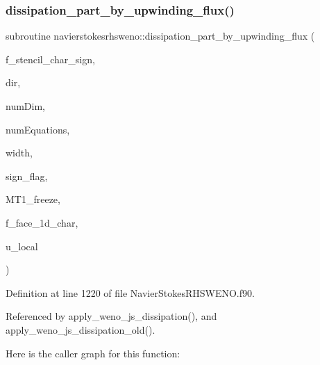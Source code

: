 \subsubsection{\texorpdfstring{dissipation\+\_\+part\+\_\+by\+\_\+upwinding\+\_\+flux()}{dissipation\_part\_by\_upwinding\_flux()}}
{\footnotesize\ttfamily subroutine navierstokesrhsweno\+::dissipation\+\_\+part\+\_\+by\+\_\+upwinding\+\_\+flux (\begin{DoxyParamCaption}\item[{real(kind=8), dimension(\hyperlink{namespacenavierstokesrhsweno_af00ac01da0553acc8e7382cfc4a5ca1b}{width},numequations)}]{f\+\_\+stencil\+\_\+char\+\_\+sign,  }\item[{integer(kind=4)}]{dir,  }\item[{integer(kind=4)}]{num\+Dim,  }\item[{integer(kind=4)}]{num\+Equations,  }\item[{integer(kind=4)}]{width,  }\item[{integer(kind=4)}]{sign\+\_\+flag,  }\item[{real(kind=8), dimension(numdim)}]{M\+T1\+\_\+freeze,  }\item[{real(kind=8), dimension(numequations)}]{f\+\_\+face\+\_\+1d\+\_\+char,  }\item[{type(\hyperlink{structnavierstokesrhsweno_1_1upwinding__local}{upwinding\+\_\+local})}]{u\+\_\+local }\end{DoxyParamCaption})}



Definition at line 1220 of file Navier\+Stokes\+R\+H\+S\+W\+E\+N\+O.\+f90.



Referenced by apply\+\_\+weno\+\_\+js\+\_\+dissipation(), and apply\+\_\+weno\+\_\+js\+\_\+dissipation\+\_\+old().

Here is the caller graph for this function\+:
\hypertarget{namespacenavierstokesrhsweno_ae41d80693f0933b732f601a4c4b52697}{}\label{namespacenavierstokesrhsweno_ae41d80693f0933b732f601a4c4b52697} 
